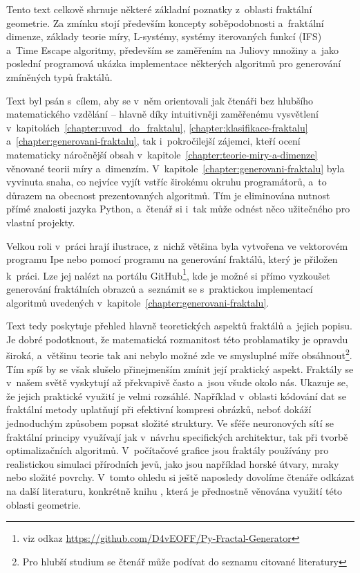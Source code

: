 
Tento text celkově shrnuje některé základní poznatky z~oblasti fraktální geometrie. Za zmínku stojí především koncepty soběpodobnosti a~fraktální dimenze, základy teorie míry, L-systémy, systémy iterovaných funkcí (IFS) a~Time Escape algoritmy, především se zaměřením na Juliovy množiny a~jako poslední programová ukázka implementace některých algoritmů pro generování zmíněných typů fraktálů.

Text byl psán s~cílem, aby se v~něm orientovali jak čtenáři bez hlubšího matematického vzdělání -- hlavně díky intuitivněji zaměřenému vysvětlení v~kapitolách~\ref{chapter:uvod_do_fraktalu}, \ref{chapter:klasifikace-fraktalu} a~\ref{chapter:generovani-fraktalu}, tak i~pokročilejší zájemci, kteří ocení matematicky náročnější obsah v~kapitole~\ref{chapter:teorie-miry-a-dimenze} věnované teorii míry a~dimenzím. V~kapitole~\ref{chapter:generovani-fraktalu} byla vyvinuta snaha, co nejvíce vyjít vstříc širokému okruhu programátorů, a~to důrazem na obecnost prezentovaných algoritmů. Tím je eliminována nutnost přímé znalosti jazyka Python, a~čtenář si i~tak může odnést něco užitečného pro vlastní projekty.

Velkou roli v~práci hrají ilustrace, z~nichž většina byla vytvořena ve vektorovém programu Ipe nebo pomocí programu na generování fraktálů, který je přiložen k~práci. Lze jej nalézt na portálu GitHub\footnote{viz odkaz \url{https://github.com/D4vEOFF/Py-Fractal-Generator}}, kde je možné si přímo vyzkoušet generování fraktálních obrazců a~seznámit se s~praktickou implementací algoritmů uvedených v~kapitole~\ref{chapter:generovani-fraktalu}.

Text tedy poskytuje přehled hlavně teoretických aspektů fraktálů a~jejich popisu. Je dobré podotknout, že matematická rozmanitost této problamatiky je opravdu široká, a~většinu teorie tak ani nebylo možné zde ve smysluplné míře obsáhnout\footnote{Pro hlubší studium se čtenář může podívat do seznamu citované literatury}. Tím spíš by se však slušelo přinejmenším zmínit její praktický aspekt. Fraktály se v~našem světě vyskytují až překvapivě často a~jsou všude okolo nás. Ukazuje se, že jejich praktické využití je velmi rozsáhlé. Například v~oblasti kódování dat se fraktální metody uplatňují při efektivní kompresi obrázků, neboť dokáží jednoduchým způsobem popsat složité struktury. Ve sféře neuronových sítí se fraktální principy využívají jak v~návrhu specifických architektur, tak při tvorbě optimalizačních algoritmů. V~počítačové grafice jsou fraktály používány pro realistickou simulaci přírodních jevů, jako jsou například horské útvary, mraky nebo složité povrchy. V~tomto ohledu si ještě naposledy dovolíme čtenáře odkázat na další literaturu, konkrétně knihu \cite{Zelinka2006}, která je přednostně věnována využití této oblasti geometrie.

